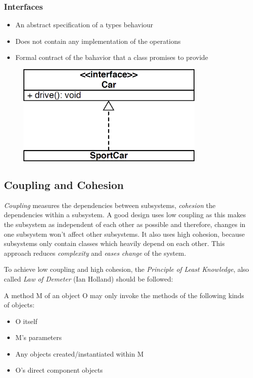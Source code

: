 \subsubsection*{Interfaces}
\begin{itemize}
	\item An abstract specification of a types behaviour
	\item Does not contain any implementation of the operations
	\item Formal contract of the bahavior that a class promises to provide
\end{itemize}
\begin{figure}[H]
	\centering
	\includegraphics[height=5cm,keepaspectratio]{images/oop_interface}
\end{figure}

\subsection{Coupling and Cohesion}
\textit{Coupling} measures the dependencies between subsystems, \textit{cohesion} the dependencies within a subsystem.
A good design uses low coupling as this makes the subsystem as independent of each other as possible and therefore, changes in one subsystem won't affect other subsystems.
It also uses high cohesion, because subsystems only contain classes which heavily depend on each other.
This approach reduces \textit{complexity} and \textit{eases change} of the system.

To achieve low coupling and high cohesion, the \textit{Principle of Least Knowledge}, also called \textit{Law of Demeter} (Ian Holland) should be followed:

A method M of an object O may only invoke the methods of the following kinds of objects:
\begin{itemize}
	\item O itself
	\item M's parameters
	\item Any objects created/instantiated within M
	\item O's direct component objects
\end{itemize}

